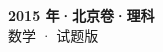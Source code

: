 \documentclass[zihao=-4, a4paper]{ctexart}
\begin{document}
\begin{center}
  {\Large\bfseries 2015 年·北京卷·理科}\\[4pt]
  {\large 数学 · 试题版}
\end{center}
\medskip
{}

\end{document}
